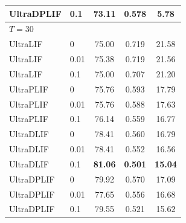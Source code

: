 \documentclass{article}
\theoremstyle{plain}
\theoremstyle{definition}
\theoremstyle{remark}
\begin{document}
\begin{table}[h]
\begin{center}
\begin{small}
\begin{tabular}{llccc}
UltraDPLIF & 0.1  & \textbf{73.11} & 0.578 & 5.78 \\
\midrule
\multicolumn{5}{l}{\textit{$T{=}30$}} \\
UltraLIF   & 0    & 75.00 & 0.719 & 21.58 \\
UltraLIF   & 0.01 & 75.38 & 0.719 & 21.56 \\
UltraLIF   & 0.1  & 75.00 & 0.707 & 21.20 \\
UltraPLIF  & 0    & 75.76 & 0.593 & 17.79 \\
UltraPLIF  & 0.01 & 75.76 & 0.588 & 17.63 \\
UltraPLIF  & 0.1  & 76.14 & 0.559 & 16.77 \\
UltraDLIF  & 0    & 78.41 & 0.560 & 16.79 \\
UltraDLIF  & 0.01 & 78.41 & 0.552 & 16.56 \\
UltraDLIF  & 0.1  & \textbf{81.06} & \textbf{0.501} & \textbf{15.04} \\
UltraDPLIF & 0    & 79.92 & 0.570 & 17.09 \\
UltraDPLIF & 0.01 & 77.65 & 0.556 & 16.68 \\
UltraDPLIF & 0.1  & 79.55 & 0.521 & 15.62 \\
\bottomrule
\end{tabular}
\end{small}
\end{center}
\vskip -0.1in
\end{table}
\end{document}
